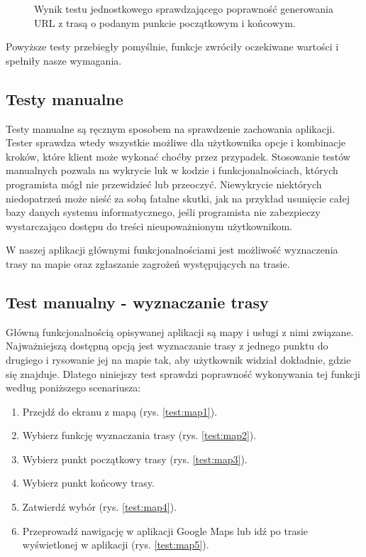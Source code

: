 \setlength{\fboxrule}{0.5pt}
\begin{figure}[H]
    \centering
    \caption{Wynik testu jednostkowego sprawdzającego poprawność generowania URL z trasą o podanym punkcie początkowym i końcowym.}
    \label{result:map}
\end{figure}

Powyższe testy przebiegły pomyślnie, funkcje zwróciły oczekiwane wartości i spełniły nasze wymagania.

\subsection{Testy manualne}
Testy manualne są ręcznym sposobem na sprawdzenie zachowania aplikacji. Tester sprawdza wtedy wszystkie możliwe dla użytkownika opcje i kombinacje kroków, które klient może wykonać choćby przez przypadek. Stosowanie testów manualnych pozwala na wykrycie luk w kodzie i funkcjonalnościach, których programista mógł nie przewidzieć lub przeoczyć. Niewykrycie niektórych niedopatrzeń może nieść za sobą fatalne skutki, jak na przykład usunięcie całej bazy danych systemu informatycznego, jeśli programista nie zabezpieczy wystarczająco dostępu do treści nieupoważnionym użytkownikom.\par
W naszej aplikacji głównymi funkcjonalnościami jest możliwość wyznaczenia trasy na mapie oraz zgłaszanie zagrożeń występujących na trasie.
\subsection*{Test manualny - wyznaczanie trasy}
Główną funkcjonalnością opisywanej aplikacji są mapy i usługi z nimi związane. Najważniejszą dostępną opcją jest wyznaczanie trasy z jednego punktu do drugiego i rysowanie jej na mapie tak, aby użytkownik widział dokładnie, gdzie się znajduje. Dlatego niniejszy test sprawdzi poprawność wykonywania tej funkcji według poniższego scenariusza:
\begin{enumerate}
    \item Przejdź do ekranu z mapą (rys. \ref{test:map1}).
    \item Wybierz funkcję wyznaczania trasy (rys. \ref{test:map2}).
    \item Wybierz punkt początkowy trasy (rys. \ref{test:map3}).
    \item Wybierz punkt końcowy trasy.
    \item Zatwierdź wybór (rys. \ref{test:map4}).
    \item Przeprowadź nawigację w aplikacji Google Maps lub idź po trasie wyświetlonej w aplikacji (rys. \ref{test:map5}).
\end{enumerate}

